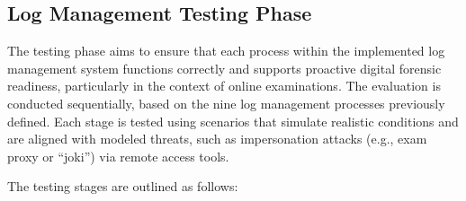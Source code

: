 \subsection{Log Management Testing Phase}

The testing phase aims to ensure that each process within the implemented log management system functions correctly and supports proactive digital forensic readiness, particularly in the context of online examinations. The evaluation is conducted sequentially, based on the nine log management processes previously defined. Each stage is tested using scenarios that simulate realistic conditions and are aligned with modeled threats, such as impersonation attacks (e.g., exam proxy or ``joki'') via remote access tools.

The testing stages are outlined as follows:

